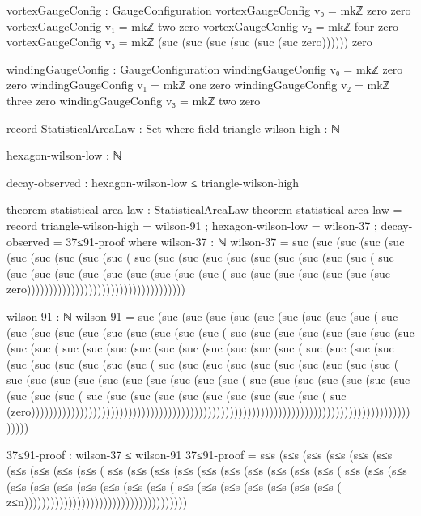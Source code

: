 \documentclass[11pt,a4paper]{book}
\begin{document}
\begin{code}
vortexGaugeConfig : GaugeConfiguration
vortexGaugeConfig v₀ = mkℤ zero zero
vortexGaugeConfig v₁ = mkℤ two zero
vortexGaugeConfig v₂ = mkℤ four zero
vortexGaugeConfig v₃ = mkℤ (suc (suc (suc (suc (suc (suc zero)))))) zero

windingGaugeConfig : GaugeConfiguration
windingGaugeConfig v₀ = mkℤ zero zero
windingGaugeConfig v₁ = mkℤ one zero
windingGaugeConfig v₂ = mkℤ three zero
windingGaugeConfig v₃ = mkℤ two zero

record StatisticalAreaLaw : Set where
  field
    triangle-wilson-high : ℕ
    
    hexagon-wilson-low : ℕ
    
    decay-observed : hexagon-wilson-low ≤ triangle-wilson-high

theorem-statistical-area-law : StatisticalAreaLaw
theorem-statistical-area-law = record
  { triangle-wilson-high = wilson-91  
  ; hexagon-wilson-low = wilson-37    
  ; decay-observed = 37≤91-proof
  }
  where
    wilson-37 : ℕ
    wilson-37 = suc (suc (suc (suc (suc (suc (suc (suc (suc (suc (
                suc (suc (suc (suc (suc (suc (suc (suc (suc (suc (
                suc (suc (suc (suc (suc (suc (suc (suc (suc (suc (
                suc (suc (suc (suc (suc (suc (suc 
                zero))))))))))))))))))))))))))))))))))))
    
    wilson-91 : ℕ
    wilson-91 = suc (suc (suc (suc (suc (suc (suc (suc (suc (suc (
                suc (suc (suc (suc (suc (suc (suc (suc (suc (suc (
                suc (suc (suc (suc (suc (suc (suc (suc (suc (suc (
                suc (suc (suc (suc (suc (suc (suc (suc (suc (suc (
                suc (suc (suc (suc (suc (suc (suc (suc (suc (suc (
                suc (suc (suc (suc (suc (suc (suc (suc (suc (suc (
                suc (suc (suc (suc (suc (suc (suc (suc (suc (suc (
                suc (suc (suc (suc (suc (suc (suc (suc (suc (suc (
                suc (suc (suc (suc (suc (suc (suc (suc (suc (suc (
                suc (zero)))))))))))))))))))))))))))))))))))))))))))))))))))))))))))))))))))))))))))))))))))))))))))
    
    37≤91-proof : wilson-37 ≤ wilson-91
    37≤91-proof = s≤s (s≤s (s≤s (s≤s (s≤s (s≤s (s≤s (s≤s (s≤s (s≤s (
                  s≤s (s≤s (s≤s (s≤s (s≤s (s≤s (s≤s (s≤s (s≤s (s≤s (
                  s≤s (s≤s (s≤s (s≤s (s≤s (s≤s (s≤s (s≤s (s≤s (s≤s (
                  s≤s (s≤s (s≤s (s≤s (s≤s (s≤s (s≤s (
                  z≤n)))))))))))))))))))))))))))))))))))))
\end{code}
\end{document}
